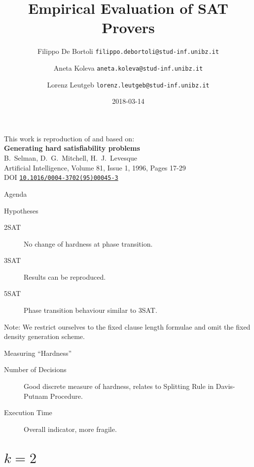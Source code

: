 \documentclass[xcolor={table,usenames,dvipsnames}]{beamer}
\title{Empirical Evaluation of SAT Provers}
\author{Filippo De Bortoli \texorpdfstring{\newline \texttt{\tiny filippo.debortoli@stud-inf.unibz.it} \newline }{<filippo.debortoli@stud-inf.unibz.it>}%
\and Aneta Koleva \texorpdfstring{\newline \texttt{\tiny aneta.koleva@stud-inf.unibz.it} \newline}{<aneta.koleva@stud-inf.unibz.it>}%
\and Lorenz Leutgeb \texorpdfstring{\newline \texttt{\tiny lorenz.leutgeb@stud-inf.unibz.it} \newline}{<lorenz.leutgeb@stud-inf.unibz.it>}}
\institute{Free University of Bozen-Bolzano}
\date{2018-03-14}
\begin{document}
\begin{frame}[plain]
\maketitle
\end{frame}

\begin{frame}[plain]
This work is reproduction of and based on:\\[3mm]

{\large\bfseries Generating hard satisfiability problems}\\[1mm]
B.\ Selman, D.\ G.\ Mitchell, H.\ J.\ Levesque\\[2mm]
Artificial Intelligence, Volume 81, Issue 1, 1996, Pages 17-29\\[1mm]
DOI \href{http://dx.doi.org/10.1016/0004-3702(95)00045-3}{\texttt{10.1016/0004-3702(95)00045-3}}\\[3mm]
{\small \color{gray}{(detailed reference in the end)}}
\end{frame}

\begin{frame}{Agenda}
\tableofcontents
\end{frame}

\begin{frame}{Hypotheses}
\begin{description}
	\item[2SAT]{No change of hardness at phase transition.}
	\item[3SAT]{Results can be reproduced.}
	\item[5SAT]{Phase transition behaviour similar to 3SAT.}
\end{description}

\alert{Note:} We restrict ourselves to the fixed clause length formulae and omit the fixed density generation scheme.
\end{frame}

\begin{frame}{Measuring \enquote{Hardness}}
\begin{description}
	\item[Number of Decisions]{Good discrete measure of hardness, relates to \alert{Splitting Rule}  in Davis-Putnam Procedure.}
	\item[Execution Time]{Overall indicator, more fragile.}
\end{description}
\end{frame}

\section{$k = 2$}
\end{document}
